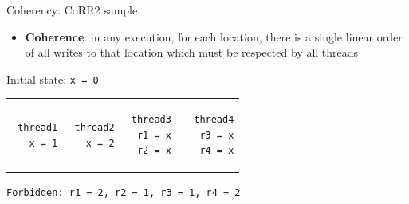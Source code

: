 \begin{frame}[t,fragile]{Coherency: CoRR2 sample}

\begin{itemize}
    \item \textbf{Coherence}: in any execution, for each location, there is a single linear order of all writes to that location which must be respected by all threads
\end{itemize}

\pause

Initial state: \texttt{x = 0}
\begin{tabular}{p{} p{} p{} p{}}
 \begin{verbatim}
 thread1
   x = 1
 \end{verbatim}
 
 & 
 
 \begin{verbatim}
 thread2
   x = 2
 \end{verbatim}
 
 &
 
 \begin{verbatim}
 thread3
  r1 = x
  r2 = x 
 \end{verbatim}
 
 &
 
 \begin{verbatim}
 thread4
  r3 = x
  r4 = x
 \end{verbatim}
 \end{tabular}
 

\pause
\texttt{Forbidden: r1 = 2, r2 = 1, r3 = 1, r4 = 2}

\end{frame}


